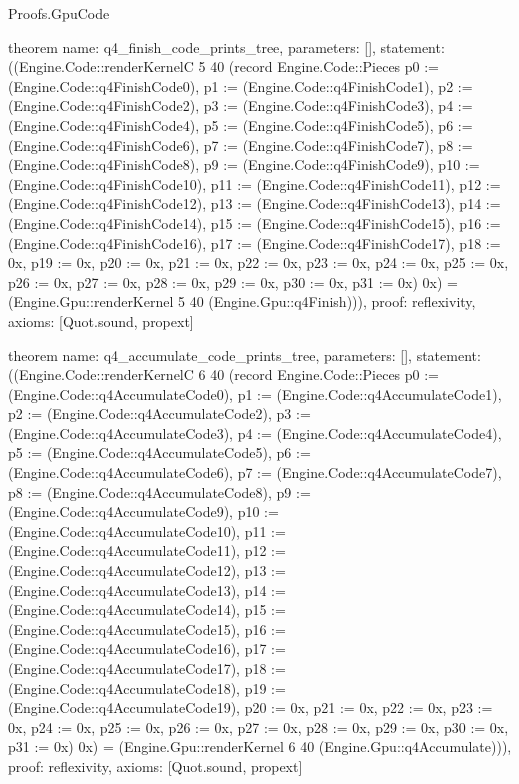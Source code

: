 \begin{lexlean}{Proofs.GpuCode}
\begin{semanticmodule}
theorem{
  name: q4_finish_code_prints_tree,
  parameters: [],
  statement: ((Engine.Code::renderKernelC 5 40 (record Engine.Code::Pieces {p0 := (Engine.Code::q4FinishCode0), p1 := (Engine.Code::q4FinishCode1), p2 := (Engine.Code::q4FinishCode2), p3 := (Engine.Code::q4FinishCode3), p4 := (Engine.Code::q4FinishCode4), p5 := (Engine.Code::q4FinishCode5), p6 := (Engine.Code::q4FinishCode6), p7 := (Engine.Code::q4FinishCode7), p8 := (Engine.Code::q4FinishCode8), p9 := (Engine.Code::q4FinishCode9), p10 := (Engine.Code::q4FinishCode10), p11 := (Engine.Code::q4FinishCode11), p12 := (Engine.Code::q4FinishCode12), p13 := (Engine.Code::q4FinishCode13), p14 := (Engine.Code::q4FinishCode14), p15 := (Engine.Code::q4FinishCode15), p16 := (Engine.Code::q4FinishCode16), p17 := (Engine.Code::q4FinishCode17), p18 := 0x, p19 := 0x, p20 := 0x, p21 := 0x, p22 := 0x, p23 := 0x, p24 := 0x, p25 := 0x, p26 := 0x, p27 := 0x, p28 := 0x, p29 := 0x, p30 := 0x, p31 := 0x}) 0x) = (Engine.Gpu::renderKernel 5 40 (Engine.Gpu::q4Finish))),
  proof: reflexivity{},
  axioms: [Quot.sound, propext]
}

theorem{
  name: q4_accumulate_code_prints_tree,
  parameters: [],
  statement: ((Engine.Code::renderKernelC 6 40 (record Engine.Code::Pieces {p0 := (Engine.Code::q4AccumulateCode0), p1 := (Engine.Code::q4AccumulateCode1), p2 := (Engine.Code::q4AccumulateCode2), p3 := (Engine.Code::q4AccumulateCode3), p4 := (Engine.Code::q4AccumulateCode4), p5 := (Engine.Code::q4AccumulateCode5), p6 := (Engine.Code::q4AccumulateCode6), p7 := (Engine.Code::q4AccumulateCode7), p8 := (Engine.Code::q4AccumulateCode8), p9 := (Engine.Code::q4AccumulateCode9), p10 := (Engine.Code::q4AccumulateCode10), p11 := (Engine.Code::q4AccumulateCode11), p12 := (Engine.Code::q4AccumulateCode12), p13 := (Engine.Code::q4AccumulateCode13), p14 := (Engine.Code::q4AccumulateCode14), p15 := (Engine.Code::q4AccumulateCode15), p16 := (Engine.Code::q4AccumulateCode16), p17 := (Engine.Code::q4AccumulateCode17), p18 := (Engine.Code::q4AccumulateCode18), p19 := (Engine.Code::q4AccumulateCode19), p20 := 0x, p21 := 0x, p22 := 0x, p23 := 0x, p24 := 0x, p25 := 0x, p26 := 0x, p27 := 0x, p28 := 0x, p29 := 0x, p30 := 0x, p31 := 0x}) 0x) = (Engine.Gpu::renderKernel 6 40 (Engine.Gpu::q4Accumulate))),
  proof: reflexivity{},
  axioms: [Quot.sound, propext]
}


\end{semanticmodule}
\end{lexlean}

